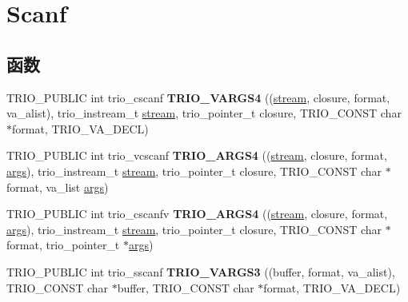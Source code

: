 \hypertarget{group___scanf}{}\section{Scanf}
\label{group___scanf}
\subsection*{函数}
\begin{DoxyCompactItemize}
\item 
\mbox{\label{group___scanf_ga0eca15afd5176d2fdbd485070fa10913}} 
T\+R\+I\+O\+\_\+\+P\+U\+B\+L\+IC int trio\+\_\+cscanf {\bfseries T\+R\+I\+O\+\_\+\+V\+A\+R\+G\+S4} ((\hyperlink{structstream}{stream}, closure, format, va\+\_\+alist), trio\+\_\+instream\+\_\+t \hyperlink{structstream}{stream}, trio\+\_\+pointer\+\_\+t closure, T\+R\+I\+O\+\_\+\+C\+O\+N\+ST char $\ast$format, T\+R\+I\+O\+\_\+\+V\+A\+\_\+\+D\+E\+CL)
\item 
\mbox{\label{group___scanf_ga4866c896d4fd5f3a3de54f8a599482f3}} 
T\+R\+I\+O\+\_\+\+P\+U\+B\+L\+IC int trio\+\_\+vcscanf {\bfseries T\+R\+I\+O\+\_\+\+A\+R\+G\+S4} ((\hyperlink{structstream}{stream}, closure, format, \hyperlink{structargs}{args}), trio\+\_\+instream\+\_\+t \hyperlink{structstream}{stream}, trio\+\_\+pointer\+\_\+t closure, T\+R\+I\+O\+\_\+\+C\+O\+N\+ST char $\ast$format, va\+\_\+list \hyperlink{structargs}{args})
\item 
\mbox{\label{group___scanf_ga136b83e66c81d1a3ff142adf43807e0c}} 
T\+R\+I\+O\+\_\+\+P\+U\+B\+L\+IC int trio\+\_\+cscanfv {\bfseries T\+R\+I\+O\+\_\+\+A\+R\+G\+S4} ((\hyperlink{structstream}{stream}, closure, format, \hyperlink{structargs}{args}), trio\+\_\+instream\+\_\+t \hyperlink{structstream}{stream}, trio\+\_\+pointer\+\_\+t closure, T\+R\+I\+O\+\_\+\+C\+O\+N\+ST char $\ast$format, trio\+\_\+pointer\+\_\+t $\ast$\hyperlink{structargs}{args})
\item 
\mbox{\label{group___scanf_ga4678791004760ed16712ddb0ab63d83b}} 
T\+R\+I\+O\+\_\+\+P\+U\+B\+L\+IC int trio\+\_\+sscanf {\bfseries T\+R\+I\+O\+\_\+\+V\+A\+R\+G\+S3} ((buffer, format, va\+\_\+alist), T\+R\+I\+O\+\_\+\+C\+O\+N\+ST char $\ast$buffer, T\+R\+I\+O\+\_\+\+C\+O\+N\+ST char $\ast$format, T\+R\+I\+O\+\_\+\+V\+A\+\_\+\+D\+E\+CL)
\item 

\end{DoxyCompactItemize}
